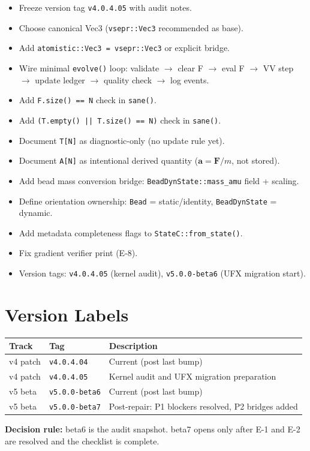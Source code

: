 \documentclass[11pt,a4paper]{article}
\begin{document}
\begin{itemize}
  \item[$\square$] Freeze version tag \texttt{v4.0.4.05} with audit notes.
  \item[$\square$] Choose canonical Vec3 (\texttt{vsepr::Vec3} recommended as base).
  \item[$\square$] Add \texttt{atomistic::Vec3 = vsepr::Vec3} or explicit bridge.
  \item[$\square$] Wire minimal \texttt{evolve()} loop: validate $\to$ clear F $\to$ eval F $\to$ VV step $\to$ update ledger $\to$ quality check $\to$ log events.
  \item[$\square$] Add \texttt{F.size() == N} check in \texttt{sane()}.
  \item[$\square$] Add \texttt{(T.empty() || T.size() == N)} check in \texttt{sane()}.
  \item[$\square$] Document \texttt{T[N]} as diagnostic-only (no update rule yet).
  \item[$\square$] Document \texttt{A[N]} as intentional derived quantity ($\mathbf{a} = \mathbf{F}/m$, not stored).
  \item[$\square$] Add bead mass conversion bridge: \texttt{BeadDynState::mass\_amu} field + scaling.
  \item[$\square$] Define orientation ownership: \texttt{Bead} = static/identity, \texttt{BeadDynState} = dynamic.
  \item[$\square$] Add metadata completeness flags to \texttt{StateC::from\_state()}.
  \item[$\square$] Fix gradient verifier print (E-8).
  \item[$\square$] Version tags: \texttt{v4.0.4.05} (kernel audit), \texttt{v5.0.0-beta6} (UFX migration start).
\end{itemize}

\section{Version Labels}

\begin{center}
\begin{tabular}{lll}
\toprule
Track & Tag & Description \\
\midrule
v4 patch & \texttt{v4.0.4.04} & Current (post last bump) \\
v4 patch & \texttt{v4.0.4.05} & Kernel audit and UFX migration preparation \\
v5 beta  & \texttt{v5.0.0-beta6} & Current (post last bump) \\
v5 beta  & \texttt{v5.0.0-beta7} & Post-repair: P1 blockers resolved, P2 bridges added \\
\bottomrule
\end{tabular}
\end{center}

\bigskip
\noindent\textbf{Decision rule:} beta6 is the audit snapshot.
beta7 opens only after E-1 and E-2 are resolved and the checklist is complete.
\end{document}
